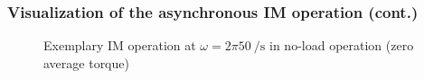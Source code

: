 \begin{frame}
	\frametitle{Visualization of the asynchronous IM operation (cont.)}
    \vspace{-0.275cm}
    \begin{figure}
        \centering
        \vspace{-0.25cm}
        \caption{Exemplary IM operation at $\omega=2 \pi \SI{50}{\per\second}$ in no-load operation (zero average torque)}
        \label{fig:IM_slip_0_load_angle_0_animation}
    \end{figure}
\end{frame}

